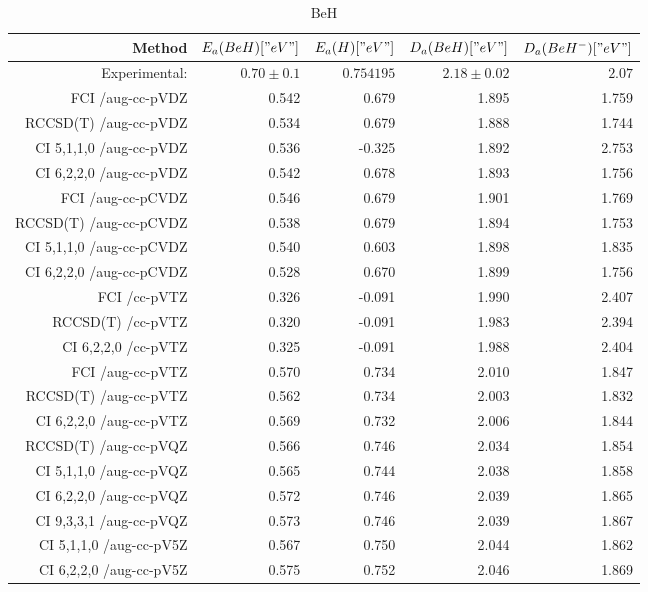 \begin{table}[]
\centering
\caption{BeH}
\label{TODO}
\begin{tabular}{rrrrr}
\toprule
Method & $E_a(BeH)[" eV"]$ & $E_a(H)[" eV"]$ & $D_a(BeH)[" eV"]$ & $D_a(BeH^-)[" eV"]$ \\ \midrule
    Experimental:  & $0.70\pm0.1$ & $0.754195$        & $2.18\pm0.02$ & $2.07$ \\ \midrule
FCI  /aug-cc-pVDZ & 0.542 & 0.679 & 1.895 & 1.759\\
RCCSD(T)  /aug-cc-pVDZ & 0.534 & 0.679 & 1.888 & 1.744\\
CI 5,1,1,0 /aug-cc-pVDZ & 0.536 & -0.325 & 1.892 & 2.753\\
CI 6,2,2,0 /aug-cc-pVDZ & 0.542 & 0.678 & 1.893 & 1.756\\
FCI  /aug-cc-pCVDZ & 0.546 & 0.679 & 1.901 & 1.769\\
RCCSD(T)  /aug-cc-pCVDZ & 0.538 & 0.679 & 1.894 & 1.753\\
CI 5,1,1,0 /aug-cc-pCVDZ & 0.540 & 0.603 & 1.898 & 1.835\\
CI 6,2,2,0 /aug-cc-pCVDZ & 0.528 & 0.670 & 1.899 & 1.756\\
FCI  /cc-pVTZ & 0.326 & -0.091 & 1.990 & 2.407\\
RCCSD(T)  /cc-pVTZ & 0.320 & -0.091 & 1.983 & 2.394\\
CI 6,2,2,0 /cc-pVTZ & 0.325 & -0.091 & 1.988 & 2.404\\
FCI  /aug-cc-pVTZ & 0.570 & 0.734 & 2.010 & 1.847\\
RCCSD(T)  /aug-cc-pVTZ & 0.562 & 0.734 & 2.003 & 1.832\\
CI 6,2,2,0 /aug-cc-pVTZ & 0.569 & 0.732 & 2.006 & 1.844\\
RCCSD(T)  /aug-cc-pVQZ & 0.566 & 0.746 & 2.034 & 1.854\\
CI 5,1,1,0 /aug-cc-pVQZ & 0.565 & 0.744 & 2.038 & 1.858\\
CI 6,2,2,0 /aug-cc-pVQZ & 0.572 & 0.746 & 2.039 & 1.865\\
CI 9,3,3,1 /aug-cc-pVQZ & 0.573 & 0.746 & 2.039 & 1.867\\
CI 5,1,1,0 /aug-cc-pV5Z & 0.567 & 0.750 & 2.044 & 1.862\\
CI 6,2,2,0 /aug-cc-pV5Z & 0.575 & 0.752 & 2.046 & 1.869\\
\bottomrule
\end{tabular}
\end{table}
    